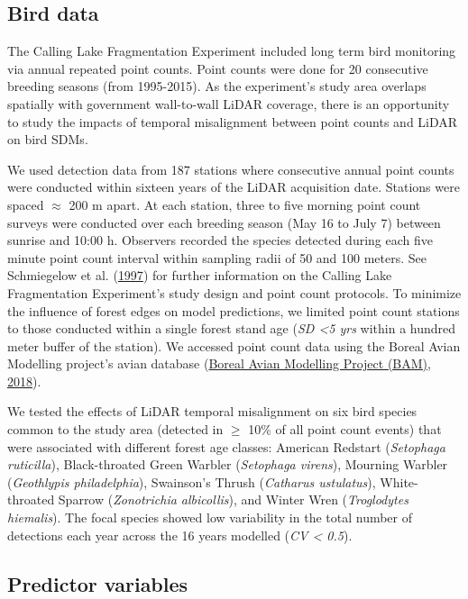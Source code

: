 \documentclass[
  12pt,
]{article}
\begin{document}
\hypertarget{bird-data}{%
\subsection{Bird data}\label{bird-data}}

The Calling Lake Fragmentation Experiment included long term bird monitoring via annual repeated point counts. Point counts were done for 20 consecutive breeding seasons (from 1995-2015). As the experiment's study area overlaps spatially with government wall-to-wall LiDAR coverage, there is an opportunity to study the impacts of temporal misalignment between point counts and LiDAR on bird SDMs.

We used detection data from 187 stations where consecutive annual point counts were conducted within sixteen years of the LiDAR acquisition date. Stations were spaced \(\approx\) 200 m apart. At each station, three to five morning point count surveys were conducted over each breeding season (May 16 to July 7) between sunrise and 10:00 h. Observers recorded the species detected during each five minute point count interval within sampling radii of 50 and 100 meters. See Schmiegelow et al. (\protect\hyperlink{ref-Schmiegelow1997}{1997}) for further information on the Calling Lake Fragmentation Experiment's study design and point count protocols. To minimize the influence of forest edges on model predictions, we limited point count stations to those conducted within a single forest stand age (\emph{SD \textless5 yrs} within a hundred meter buffer of the station). We accessed point count data using the Boreal Avian Modelling project's avian database (\protect\hyperlink{ref-BAM2018}{Boreal Avian Modelling Project (BAM), 2018}).

We tested the effects of LiDAR temporal misalignment on six bird species common to the study area (detected in \(\ge\) 10\% of all point count events) that were associated with different forest age classes: American Redstart (\emph{Setophaga ruticilla}), Black-throated Green Warbler (\emph{Setophaga virens}), Mourning Warbler (\emph{Geothlypis philadelphia}), Swainson's Thrush (\emph{Catharus ustulatus}), White-throated Sparrow (\emph{Zonotrichia albicollis}), and Winter Wren (\emph{Troglodytes hiemalis}). The focal species showed low variability in the total number of detections each year across the 16 years modelled (\emph{CV \textless{} 0.5}).

\hypertarget{predictor-variables}{%
\subsection{Predictor variables}\label{predictor-variables}}
\end{document}
